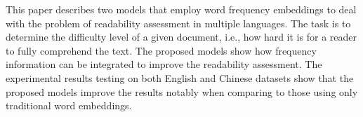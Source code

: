 This paper describes two models that employ word frequency embeddings to deal with the problem of readability assessment in multiple languages. The task is to determine the difficulty level of a given document, i.e., how hard it is for a reader to fully comprehend the text. The proposed models show how frequency information can be integrated to improve the readability assessment. The experimental results testing on both English and Chinese datasets show that the proposed models improve the results notably when comparing to those using only traditional word embeddings.
